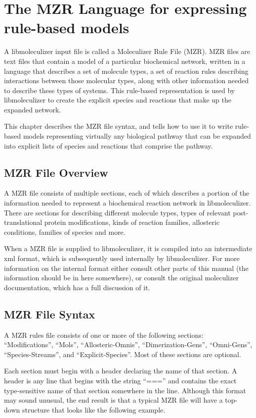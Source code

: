 \chapter{The MZR Language for expressing rule-based models}
\label{chap:theRulesChapter}
A libmoleculizer input file is called a Moleculizer Rule File (MZR).
MZR files are text files that contain a model of a particular
biochemical network, written in a language that describes a set of
molecule types, a set of reaction rules describing interactions
between those molecular types, along with other information needed to
describe these types of systems.  This rule-based representation is
used by libmoleculizer to create the explicit species and reactions
that make up the expanded network.

This chapter describes the MZR file syntax, and tells how to use it to
write rule-based models representing virtually any biological pathway
that can be expanded into explicit lists of species and reactions that
comprise the pathway.  

\section{MZR File Overview}
A MZR file consists of multiple sections, each of which describes a
portion of the information needed to represent a biochemical reaction
network in libmoleculizer.  There are sections for describing
different molecule types, types of relevant post-translational protein
modifications, kinds of reaction families, allosteric conditions,
families of species and more.

When a MZR file is supplied to libmoleculizer, it is compiled into an
intermediate xml format, which is subsequently used internally by
libmoleculizer.  For more information on the internal format either
consult other parts of this manual (the information should be in here
somewhere), or consult the original moleculizer documentation, which
has a full discussion of it.

\section{MZR File Syntax}
A MZR rules file consists of one or more of the following sections:
``Modifications'', ``Mols'', ``Allosteric-Omnis'',
``Dimerization-Gens'', ``Omni-Gens'', ``Species-Streams'', and
``Explicit-Species''.  Most of these sections are optional.

Each section must begin with a header declaring the name of that
section.  A header is any line that begins with the string ``==='' and
contains the exact type-sensitive name of that section somewhere in
the line.  Although this format may sound unusual, the end result is
that a typical MZR file will have a top-down structure that looks like
the following example.

